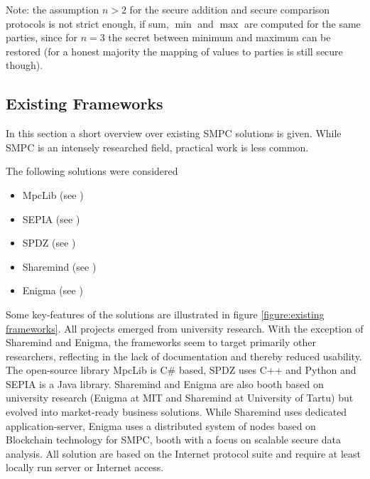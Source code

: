 		Note: the assumption $n>2$ for the secure addition and secure comparison protocols is not strict enough, if sum, $\min$ and $\max$ are computed for the same parties, since for $n=3$ the secret between minimum and maximum can be restored (for a honest majority the mapping of values to parties is still secure though).
		
		\subsection{Existing Frameworks} \label{Existing Frameworks}
		
		In this section a short overview over existing \gls{SMPC} solutions is given. While \gls{SMPC} is an intensely researched field, practical work is less common.
		
		The following solutions were considered
		
		\begin{itemize}
			\item MpcLib (see \textcite{Online:MpcLib})
			\item SEPIA (see \textcite{Online:Sepia})
			\item SPDZ (see \textcite{Online:SPDZ})
			\item Sharemind (see \textcite{Online:Sharemind})
			\item Enigma (see \textcite{Online:Enigma})
		\end{itemize}
		
		Some key-features of the solutions are illustrated in figure \ref{figure:existing frameworks}. All projects emerged from university research. With the exception of Sharemind and Enigma, the frameworks seem to target primarily other researchers, reflecting in the lack of documentation and thereby reduced usability. The open-source library MpcLib is C\# based, SPDZ uses C++ and Python and SEPIA is a Java library.  Sharemind and Enigma are also booth based on university research (Enigma at MIT and Sharemind at University of Tartu) but evolved into market-ready business solutions. While Sharemind uses dedicated application-server, Enigma uses a distributed system of nodes based on Blockchain technology for \gls{SMPC}, booth with a focus on scalable secure data analysis.
		All solution are based on the Internet protocol suite and require at least locally run server or Internet access.
		
